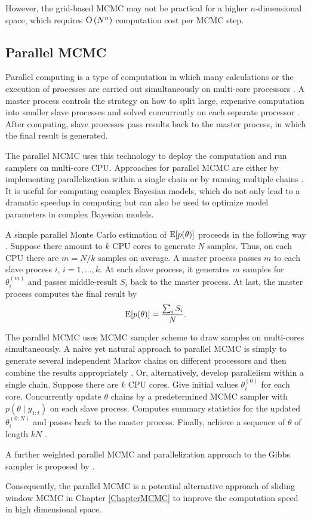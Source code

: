 However, the grid-based MCMC may not be practical for a higher $n$-dimensional space, which requires ${\rm O}\left(N^n\right)$ computation cost per MCMC step. 


\subsection*{Parallel MCMC}

Parallel computing is a type of computation in which many calculations or the execution of processes are carried out simultaneously on multi-core processors \citep{asanovic2006landscape}. A master process controls the strategy on how to split large, expensive computation into smaller slave processes and solved concurrently on each separate processor \citep{Almasi1994Highly}. After computing, slave processes pass results back to the master process, in which the final result is generated. 

The parallel MCMC uses this technology to deploy the computation and run samplers on multi-core CPU. Approaches for parallel MCMC are either by implementing parallelization within a single chain or by running multiple chains \citep{wu2012parallel}. It is useful for computing complex Bayesian models, which do not only lead to a dramatic speedup in computing but can also be used to optimize model parameters in complex Bayesian models.

A simple parallel Monte Carlo estimation of $\mathrm{E}\lbrack p(\theta)\rbrack$ proceeds in the following way \citep{kontoghiorghes2005handbook}. Suppose there amount to $k$ CPU cores to generate $N$ samples. Thus, on each CPU there are $m=N/k$ samples on average. A master process passes $m$ to each slave process $i$, $i=1,\ldots,k$. At each slave process, it generates $m$ samples for $\theta_i^{(m)}$ and passes middle-result $S_i$ back to the master process. At last, the master process computes the final result by 
\begin{equation*}
\mathrm{E}\lbrack p(\theta)\rbrack=\frac{\sum_i S_i}{N}. 
\end{equation*}

The parallel MCMC uses MCMC sampler scheme to draw samples on multi-cores simultaneously. A naive yet natural approach to parallel MCMC is simply to generate several independent Markov chains on different
processors and then combine the results appropriately \citep{bradford1996markov, gelman1992inference}. Or, alternatively, develop parallelism within a single chain. Suppose there are $k$ CPU cores. Give initial values $\theta_i^{(0)}$ for each core. Concurrently update $\theta$ chains by a predetermined MCMC sampler with $p(\theta\mid y_{1:t})$ on each slave process. Computes summary statistics for the updated $\theta_i^{(0: N)}$ and passes back to the master process. Finally, achieve a sequence of $\theta$ of length $kN$ \citep{wu2012parallel}. 

A further weighted parallel MCMC and parallelization approach to the Gibbs sampler is proposed by \cite{vanderwerken2013parallel}.

Consequently, the parallel MCMC is a potential alternative approach of sliding window MCMC in Chapter \ref{ChapterMCMC} to improve the computation speed in high dimensional space. 


